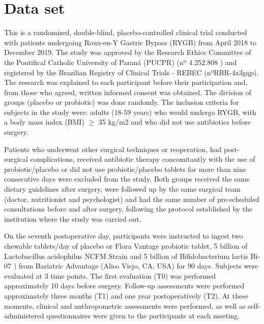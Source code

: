 \documentclass[USenglish]{article}
\theoremstyle{dgthm}
\theoremstyle{dgdef}
\begin{document}

\section{Data set}\label{sec2}


This is a randomized, double-blind, placebo-controlled clinical trial conducted with patients undergoing Roux-en-Y Gastric Bypass (RYGB) from April 2018 to December 2019. The study was approved by the Research Ethics Committee of the Pontifical Catholic University of Paraná (PUCPR) (nº 4.252.808 ) and registered by the Brazilian Registry of Clinical Trials - REBEC (nºRBR-4x3gqp). The research was explained to each participant before their participation and, from those who agreed, written informed consent was obtained. The division of groups (placebo or probiotic) was done randomly. The inclusion criteria for subjects in the study were: adults (18-59 years) who would undergo RYGB, with a body mass index (BMI) $\geq$ 35 kg/m2 and who did not use antibiotics before surgery. 

Patients who underwent other surgical techniques or reoperation, had post-surgical complications, received antibiotic therapy concomitantly with the use of probiotic/placebo or did not use probiotic/placebo tablets for more than nine consecutive days were excluded from the study. Both groups received the same dietary guidelines after surgery, were followed up by the same surgical team (doctor, nutritionist and psychologist) and had the same number of pre-scheduled consultations before and after surgery, following the protocol established by the institution where the study was carried out.

On the seventh postoperative day, participants were instructed to ingest two chewable tablets/day of placebo or Flora Vantage probiotic tablet, 5 billion of Lactobacillus acidophilus NCFM \textregistered Strain and 5 billion of Bifidobacterium lactis Bi-07 \textregistered) from Bariatric Advantage (Aliso Viejo, CA, USA) for 90 days. Subjects were evaluated at 3 time points. The first evaluation (T0) was performed approximately 10 days before surgery. Follow-up assessments were performed approximately three months (T1) and one year postoperatively (T2). At these moments, clinical and anthropometric assessments were performed, as well as self-administered questionnaires were given to the participants at each meeting.
\end{document}
